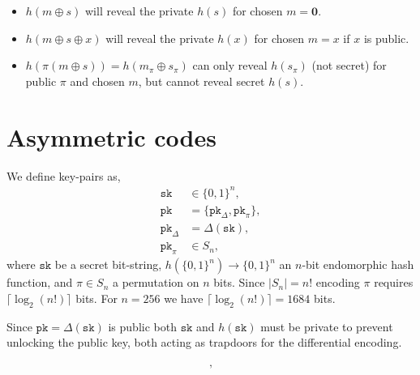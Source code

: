 \documentclass[twocolumn, aps, amsmath, amssymb, nofootinbib, superscriptaddress, longbibliography, doublefloatfix, table-of-contents, eqsecnum, rmp]{revtex4-2}
\begin{document}
\begin{itemize}
	\item $h(m\oplus s)$ will reveal the private $h(s)$ for chosen $m=\mathbf{0}$.
	\item $h(m\oplus s \oplus x)$ will reveal the private $h(x)$ for chosen $m=x$ if $x$ is public.
	\item $h(\pi(m\oplus s)) = h(m_\pi \oplus s_\pi)$ can only reveal $h(s_\pi)$ (not secret) for public $\pi$ and chosen $m$, but cannot reveal secret $h(s)$.
\end{itemize}

\section{Asymmetric codes}

We define key-pairs as,
\begin{align}
	\mathtt{sk} &\in \{0,1\}^n, \nonumber\\
	\mathtt{pk} &= \{\mathtt{pk}_\Delta,\mathtt{pk}_\pi\},\nonumber\\
	\mathtt{pk}_\Delta &= \Delta(\mathtt{sk}),\nonumber\\
	\mathtt{pk}_\pi &\in S_n,
\end{align}
where $\mathtt{sk}$ be a secret bit-string, $h(\{0,1\}^n)\to\{0,1\}^n$ an $n$-bit endomorphic hash function, and $\pi\in S_n$ a permutation on $n$ bits. Since $|S_n|=n!$ encoding $\pi$ requires $\lceil\log_2(n!)\rceil$ bits. For $n=256$ we have $\lceil\log_2(n!)\rceil = 1684$ bits.

Since $\mathtt{pk} = \Delta(\mathtt{sk})$ is public both $\mathtt{sk}$ and $h(\mathtt{sk})$ must be private to prevent unlocking the public key, both acting as trapdoors for the differential encoding.



\begin{align}
	[m_\pi \oplus s_\pi, \Delta_\pi(m_\pi\oplus s_\pi)],
\end{align}
\end{document}
